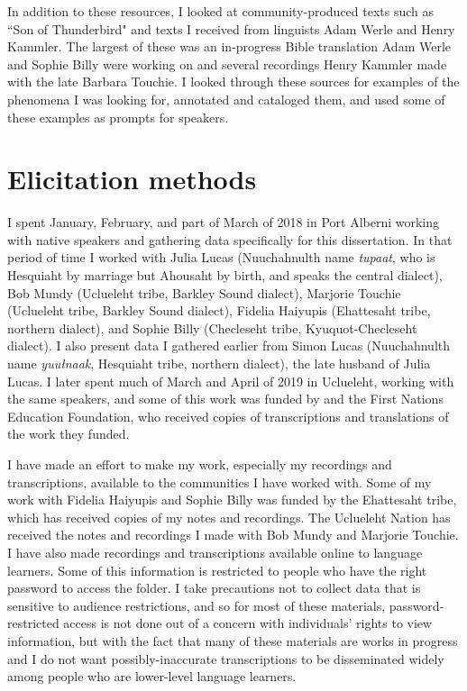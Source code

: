 In addition to these resources, I looked at community-produced texts such as ``Son of Thunderbird" and texts I received from linguists Adam Werle and Henry Kammler. The largest of these was an in-progress Bible translation Adam Werle and Sophie Billy were working on and several recordings Henry Kammler made with the late Barbara Touchie. I looked through these sources for examples of the phenomena I was looking for, annotated and cataloged them, and used some of these examples as prompts for speakers.

\section{Elicitation methods} \label{ch:method:elicitation}

I spent January, February, and part of March of 2018 in Port Alberni working with native speakers and gathering data specifically for this dissertation. In that period of time I worked with Julia Lucas (Nuuchahnulth name \textit{tupaat}, who is Hesquiaht by marriage but Ahousaht by birth, and speaks the central dialect), Bob Mundy (Uclueleht tribe, Barkley Sound dialect), Marjorie Touchie (Uclueleht tribe, Barkley Sound dialect), Fidelia Haiyupis (Ehattesaht tribe, northern dialect), and Sophie Billy (Checleseht tribe, Kyuquot-Checleseht dialect). I also present data I gathered earlier from Simon Lucas (Nuuchahnulth name \textit{yuułnaak}, Hesquiaht tribe, northern dialect), the late husband of Julia Lucas. I later spent much of March and April of 2019 in Uclueleht, working with the same speakers, and some of this work was funded by and the First Nations Education Foundation, who received copies of transcriptions and translations of the work they funded.

I have made an effort to make my work, especially my recordings and transcriptions, available to the communities I have worked with. Some of my work with Fidelia Haiyupis and Sophie Billy was funded by the Ehattesaht tribe, which has received copies of my notes and recordings. The Uclueleht Nation has received the notes and recordings I made with Bob Mundy and Marjorie Touchie. I have also made recordings and transcriptions available online to language learners. Some of this information is restricted to people who have the right password to access the folder. I take precautions not to collect data that is sensitive to audience restrictions, and so for most of these materials, password-restricted access is not done out of a concern with individuals' rights to view information, but with the fact that many of these materials are works in progress and I do not want possibly-inaccurate transcriptions to be disseminated widely among people who are lower-level language learners.

